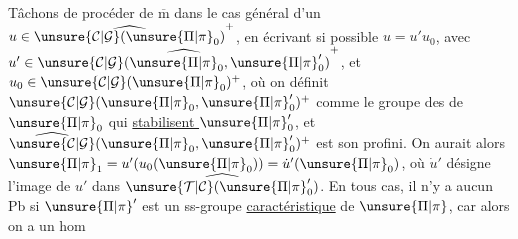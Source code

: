Tâchons de procéder de $\overline{\mathrm m}$ dans le cas général d'un $u\in\widehat{\unsure{\mathcal{C}|\mathcal{G}}(\unsure{\Pi|\pi}_0)}^+$,  en écrivant si possible $u=u'u_0$, avec $u'\in\widehat{\unsure{\mathcal{C}|\mathcal{G}}(\unsure{\Pi|\pi}_0,\unsure{\Pi|\pi}'_0)}^+$, et $u_0\in\unsure{\mathcal{C}|\mathcal{G}}(\unsure{\Pi|\pi}_0)^+$, où on définit $\unsure{\mathcal{C}|\mathcal{G}}(\unsure{\Pi|\pi}_0,\unsure{\Pi|\pi}'_0)^+$ comme le groupe des   de $\unsure{\Pi|\pi}_0$ qui \uline{stabilisent $\unsure{\Pi|\pi}'_0$}, et $\widehat{\unsure{\mathcal{C}|\mathcal{G}}}(\unsure{\Pi|\pi}_0,\unsure{\Pi|\pi}'_0)^+$ est son  profini. On aurait alors $\unsure{\Pi|\pi}_1=u'(u_0(\unsure{\Pi|\pi}_0))=\dot{u}'(\unsure{\Pi|\pi}_0)$, où  $\dot{u}'$ désigne l'image de $u'$ dans $\widehat{\unsure{\mathcal{T}|\mathcal{C}}(\unsure{\Pi|\pi}'_0)}$. En tous cas, il n'y a aucun Pb si $\unsure{\Pi|\pi}'$ est un ss-groupe  \uline{caractéristique} de $\unsure{\Pi|\pi}$, car alors on a un hom

